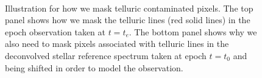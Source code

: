 \begin{figure}
\\
\caption{Illustration for how we mask telluric contaminated
pixels. The top panel shows how we mask the telluric lines (red solid
lines) in the epoch observation taken at $t=t_e$. The bottom panel
shows why we also need to mask pixels associated with telluric lines
in the deconvolved stellar reference spectrum taken at epoch $t=t_0$
and being shifted in order to model the observation.
\label{fig:dsstmask}}
\end{figure}


